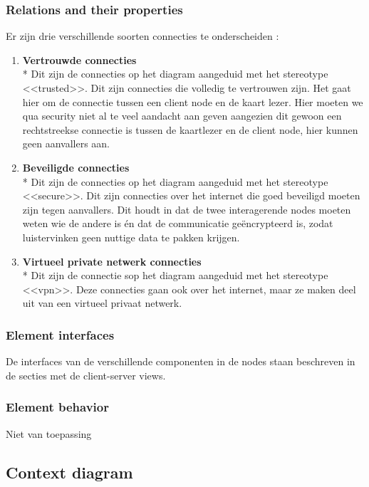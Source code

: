 \documentclass[a4paper,10pt]{article}
\begin{document}
\subsubsection{Relations and their properties}
\label{subsubsec:relations_deployment}
Er zijn drie verschillende soorten connecties te onderscheiden : 
\begin{enumerate}
 \item \textbf{Vertrouwde connecties}\\*
Dit zijn de connecties op het diagram aangeduid met het stereotype <<trusted>>. Dit zijn connecties die volledig te vertrouwen zijn. Het gaat hier om de connectie tussen een client node en de kaart lezer. Hier moeten we qua security niet al te veel aandacht aan geven aangezien dit gewoon een rechtstreekse connectie is tussen de kaartlezer en de client node, hier kunnen geen aanvallers aan. 
\item \textbf{Beveiligde connecties}\\*
Dit zijn de connecties op het diagram aangeduid met het stereotype <<secure>>. Dit zijn connecties over het internet die goed beveiligd moeten zijn tegen aanvallers. Dit houdt in dat de twee interagerende nodes moeten weten wie de andere is én dat de communicatie geëncrypteerd is, zodat luistervinken geen nuttige data te pakken krijgen.
\item \textbf{Virtueel private netwerk connecties}\\*
Dit zijn de connectie sop het diagram aangeduid met het stereotype <<vpn>>. Deze connecties gaan ook over het internet, maar ze maken deel uit van een virtueel privaat netwerk.
\end{enumerate}

\subsubsection{Element interfaces}

De interfaces van de verschillende componenten in de nodes staan beschreven in de secties met de client-server views.

\subsubsection{Element behavior}

Niet van toepassing

\subsection{Context diagram}
\end{document}

